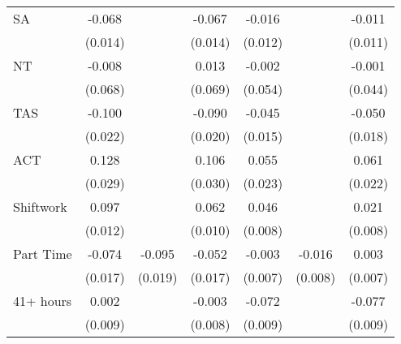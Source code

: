 {\begin{tabular}{l*{6}{c}}
SA                  &      -0.068\sym{***}&                     &      -0.067\sym{***}&      -0.016         &                     &      -0.011         \\
                    &     (0.014)         &                     &     (0.014)         &     (0.012)         &                     &     (0.011)         \\
NT                  &      -0.008         &                     &       0.013         &      -0.002         &                     &      -0.001         \\
                    &     (0.068)         &                     &     (0.069)         &     (0.054)         &                     &     (0.044)         \\
TAS                 &      -0.100\sym{***}&                     &      -0.090\sym{***}&      -0.045\sym{***}&                     &      -0.050\sym{***}\\
                    &     (0.022)         &                     &     (0.020)         &     (0.015)         &                     &     (0.018)         \\
ACT                 &       0.128\sym{***}&                     &       0.106\sym{***}&       0.055\sym{**} &                     &       0.061\sym{***}\\
                    &     (0.029)         &                     &     (0.030)         &     (0.023)         &                     &     (0.022)         \\
Shiftwork           &       0.097\sym{***}&                     &       0.062\sym{***}&       0.046\sym{***}&                     &       0.021\sym{***}\\
                    &     (0.012)         &                     &     (0.010)         &     (0.008)         &                     &     (0.008)         \\
Part Time           &      -0.074\sym{***}&      -0.095\sym{***}&      -0.052\sym{***}&      -0.003         &      -0.016\sym{**} &       0.003         \\
                    &     (0.017)         &     (0.019)         &     (0.017)         &     (0.007)         &     (0.008)         &     (0.007)         \\
41+ hours           &       0.002         &                     &      -0.003         &      -0.072\sym{***}&                     &      -0.077\sym{***}\\
                    &     (0.009)         &                     &     (0.008)         &     (0.009)         &                     &     (0.009)         \\

\end{tabular}}
